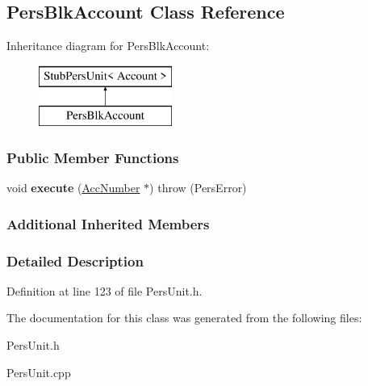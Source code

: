 \hypertarget{classPersBlkAccount}{\subsection{Pers\-Blk\-Account Class Reference}
\label{d6/d7d/classPersBlkAccount}
}
Inheritance diagram for Pers\-Blk\-Account\-:\begin{figure}[H]
\begin{center}
\leavevmode
\includegraphics[height=2.000000cm]{d6/d7d/classPersBlkAccount}
\end{center}
\end{figure}
\subsubsection*{Public Member Functions}
\begin{DoxyCompactItemize}
\item 
\hypertarget{classPersBlkAccount_ac194c547436f62695c246d1f32e7574c}{void {\bfseries execute} (\hyperlink{classAccNumber}{Acc\-Number} $\ast$)  throw (\-Pers\-Error)}\label{d6/d7d/classPersBlkAccount_ac194c547436f62695c246d1f32e7574c}

\end{DoxyCompactItemize}
\subsubsection*{Additional Inherited Members}


\subsubsection{Detailed Description}


Definition at line 123 of file Pers\-Unit.\-h.



The documentation for this class was generated from the following files\-:\begin{DoxyCompactItemize}
\item 
Pers\-Unit.\-h\item 
Pers\-Unit.\-cpp\end{DoxyCompactItemize}
